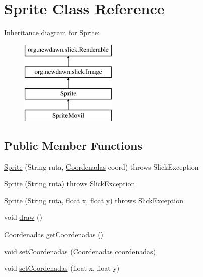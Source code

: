 \hypertarget{class_sprite}{}\section{Sprite Class Reference}
\label{class_sprite}
Inheritance diagram for Sprite\+:\begin{figure}[H]
\begin{center}
\leavevmode
\includegraphics[height=4.000000cm]{class_sprite}
\end{center}
\end{figure}
\subsection*{Public Member Functions}
\begin{DoxyCompactItemize}
\item 
\mbox{\hyperlink{class_sprite_ad2d0e8ee8d56c6939aeb7c85e8f95ad1}{Sprite}} (String ruta, \mbox{\hyperlink{class_coordenadas}{Coordenadas}} coord)  throws Slick\+Exception
\item 
\mbox{\hyperlink{class_sprite_abcc912a68992f5d1f3566386f885f9bb}{Sprite}} (String ruta)  throws Slick\+Exception
\item 
\mbox{\hyperlink{class_sprite_a0a53bf04225c024f0499c8c2bd092b5d}{Sprite}} (String ruta, float x, float y)  throws Slick\+Exception
\item 
void \mbox{\hyperlink{class_sprite_a0d3088cb4ee83eb438a48bb47351fe8e}{draw}} ()
\item 
\mbox{\hyperlink{class_coordenadas}{Coordenadas}} \mbox{\hyperlink{class_sprite_a1ea85b8bbd32ba06d279b76b3ffad9e0}{get\+Coordenadas}} ()
\item 
void \mbox{\hyperlink{class_sprite_ab6507a100fad450d688f71d08cc91715}{set\+Coordenadas}} (\mbox{\hyperlink{class_coordenadas}{Coordenadas}} \mbox{\hyperlink{class_sprite_ada651b6921cee54a619e11c4eb01526d}{coordenadas}})
\item 
void \mbox{\hyperlink{class_sprite_abc4cf5a191273ec5ae4943b95d3198cb}{set\+Coordenadas}} (float x, float y)
\end{DoxyCompactItemize}
